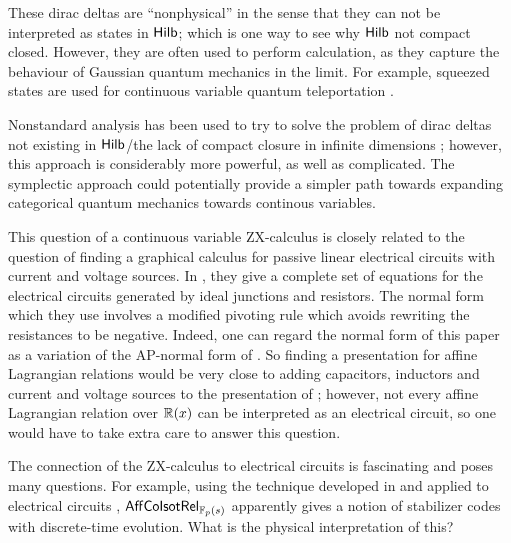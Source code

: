 These   dirac deltas are ``nonphysical'' in the sense that they can not be interpreted as states in $\mathsf{Hilb}$; which is one way to see why $\mathsf{Hilb}$ not compact closed.  However, they are often used  to perform calculation, as they capture the behaviour of Gaussian quantum mechanics in the limit.  For example, squeezed states are used for continuous variable quantum teleportation \cite{Milburn1999}. 

Nonstandard analysis has been used to try to solve the problem of dirac deltas not existing in $\mathsf{Hilb}$/the lack of compact closure in infinite dimensions \cite{Gogioso2017}; however, this approach is considerably more powerful, as well as complicated.  The symplectic approach could potentially provide a simpler path towards expanding categorical quantum mechanics towards continous variables.

\nocite{kirch}

This question of a continuous variable ZX-calculus is closely related to the question of finding a graphical calculus for passive linear electrical circuits with current and voltage sources.  In \cite{amolak}, they give a complete set of equations for the electrical circuits generated by ideal junctions and resistors.  The normal form which they use involves a modified pivoting rule which avoids rewriting the resistances to be negative.  Indeed, one can regard the normal form of this paper as a variation of the AP-normal form of \cite{poor}.  So finding a presentation for affine Lagrangian relations would be very close to adding capacitors, inductors and current and voltage sources to the presentation of \cite{amolak}; however, not every affine Lagrangian relation over $\mathbb{R}(x)$ can be interpreted as an electrical circuit, so one would have to take extra care to answer this question.

The connection of the ZX-calculus to electrical circuits is fascinating and poses many questions.  For example, using the technique developed in \cite{control} and applied to electrical circuits \cite{network}, $\mathsf{Aff}{\sf Co}{\sf Isot}\mathsf{Rel}_{\mathbb{F}_p(s)}$ apparently gives a notion of stabilizer codes with discrete-time evolution.  What is the physical interpretation of this?

%
%
%
%
%
%
%
%
%
%

